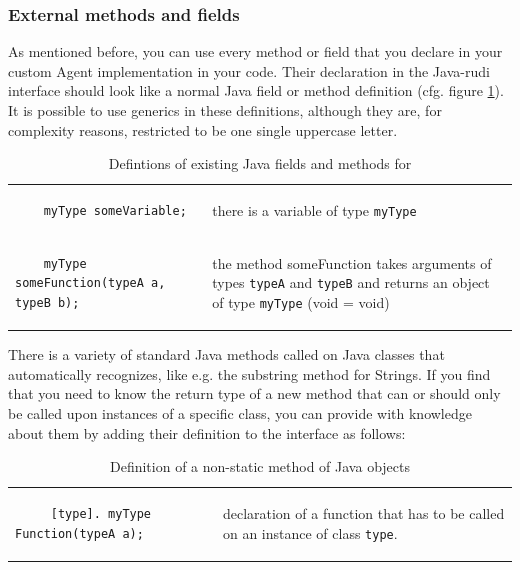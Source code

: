 \subsubsection{External methods and fields}
\label{sec:javatypes}

As mentioned before, you can use every method or field that you declare in your custom Agent implementation in your \vonda code. Their declaration in the Java-rudi interface should look like a normal Java field or method definition (cfg. figure \ref{tab:javadef}). It is possible to use generics in these definitions, although they are, for complexity reasons, restricted to be one single uppercase letter.

\begin{table}[htbp]
  \small
  \begin{tabular}{lp{}}
    \begin{lstlisting}
    myType someVariable;
    \end{lstlisting}
    &  there is a variable of type \texttt{myType} \\

    \begin{lstlisting}
    myType someFunction(typeA a, typeB b);
    \end{lstlisting}
    &  the method someFunction takes arguments of types \texttt{typeA} and
      \texttt{typeB} and returns an object of type \texttt{myType} (void =
      void)
  \end{tabular}

  \caption{Defintions of existing Java fields and methods for \vonda}
  \label{tab:javadef}
\end{table}

There is a variety of standard Java methods called on Java classes that \vonda automatically recognizes, like e.g. the substring method for Strings. If you find that you need \vonda to know the return type of a new method that can or should only be called upon instances of a specific class, you can provide \vonda with knowledge about them by adding their definition to the interface as follows:


\begin{table}[htbp]
  \centering
  \small
  \begin{tabular}{lp{}}

    \begin{lstlisting}
     [type]. myType Function(typeA a);
    \end{lstlisting}
    & declaration of a function that has to be called on an instance of class \texttt{type}.
  \end{tabular}

  \caption{Definition of a non-static method of Java objects}
  \label{tab:methoddef}
\end{table}

